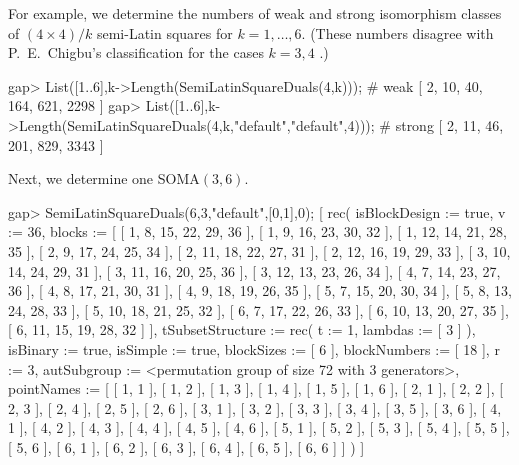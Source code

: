For example, we determine the numbers of weak and strong isomorphism
classes of $(4\times 4)/k$ semi-Latin squares for $k=1,\ldots,6$. (These
numbers disagree with P.~E.~Chigbu's classification for the cases $k=3,4$
\cite{BaCh}.)

\beginexample
gap> List([1..6],k->Length(SemiLatinSquareDuals(4,k))); # weak
[ 2, 10, 40, 164, 621, 2298 ]
gap> List([1..6],k->Length(SemiLatinSquareDuals(4,k,"default","default",4))); # strong
[ 2, 11, 46, 201, 829, 3343 ]
\endexample

Next, we determine one SOMA$(3,6)$. 

\beginexample
gap> SemiLatinSquareDuals(6,3,"default",[0,1],0);
[ rec( isBlockDesign := true, v := 36, 
      blocks := [ [ 1, 8, 15, 22, 29, 36 ], [ 1, 9, 16, 23, 30, 32 ], 
          [ 1, 12, 14, 21, 28, 35 ], [ 2, 9, 17, 24, 25, 34 ], 
          [ 2, 11, 18, 22, 27, 31 ], [ 2, 12, 16, 19, 29, 33 ], 
          [ 3, 10, 14, 24, 29, 31 ], [ 3, 11, 16, 20, 25, 36 ], 
          [ 3, 12, 13, 23, 26, 34 ], [ 4, 7, 14, 23, 27, 36 ], 
          [ 4, 8, 17, 21, 30, 31 ], [ 4, 9, 18, 19, 26, 35 ], 
          [ 5, 7, 15, 20, 30, 34 ], [ 5, 8, 13, 24, 28, 33 ], 
          [ 5, 10, 18, 21, 25, 32 ], [ 6, 7, 17, 22, 26, 33 ], 
          [ 6, 10, 13, 20, 27, 35 ], [ 6, 11, 15, 19, 28, 32 ] ], 
      tSubsetStructure := rec( t := 1, lambdas := [ 3 ] ), isBinary := true, 
      isSimple := true, blockSizes := [ 6 ], blockNumbers := [ 18 ], r := 3, 
      autSubgroup := <permutation group of size 72 with 3 generators>, 
      pointNames := [ [ 1, 1 ], [ 1, 2 ], [ 1, 3 ], [ 1, 4 ], [ 1, 5 ], 
          [ 1, 6 ], [ 2, 1 ], [ 2, 2 ], [ 2, 3 ], [ 2, 4 ], [ 2, 5 ], 
          [ 2, 6 ], [ 3, 1 ], [ 3, 2 ], [ 3, 3 ], [ 3, 4 ], [ 3, 5 ], 
          [ 3, 6 ], [ 4, 1 ], [ 4, 2 ], [ 4, 3 ], [ 4, 4 ], [ 4, 5 ], 
          [ 4, 6 ], [ 5, 1 ], [ 5, 2 ], [ 5, 3 ], [ 5, 4 ], [ 5, 5 ], 
          [ 5, 6 ], [ 6, 1 ], [ 6, 2 ], [ 6, 3 ], [ 6, 4 ], [ 6, 5 ], 
          [ 6, 6 ] ] ) ]
\endexample
